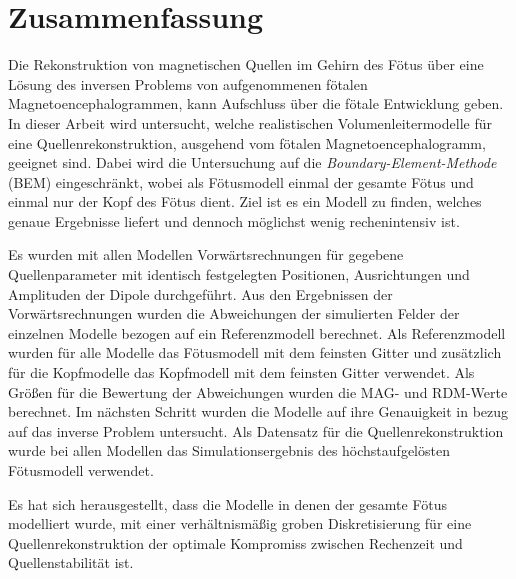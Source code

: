 
\chapter{Zusammenfassung}
Die Rekonstruktion von magnetischen Quellen im Gehirn des Fötus über
eine Lösung des inversen Problems von aufgenommenen fötalen
Magnetoencephalogrammen, kann Aufschluss über die fötale Entwicklung
geben. In dieser Arbeit wird untersucht, welche realistischen
Volumenleitermodelle für eine Quellenrekonstruktion, ausgehend vom
fötalen Magnetoencephalogramm, geeignet sind. Dabei wird die
Untersuchung auf die \textit{Boundary-Element-Methode} (BEM)
eingeschränkt, wobei als Fötusmodell einmal der gesamte Fötus und
einmal nur der Kopf des Fötus dient. Ziel ist es ein Modell zu finden,
welches genaue Ergebnisse liefert und dennoch möglichst wenig
rechenintensiv ist.

Es wurden mit allen Modellen Vorwärtsrechnungen für gegebene
Quellenparameter mit identisch festgelegten Positionen, Ausrichtungen
und Amplituden der Dipole durchgeführt. Aus den Ergebnissen der
Vorwärtsrechnungen wurden die Abweichungen der simulierten Felder der
einzelnen Modelle bezogen auf ein Referenzmodell berechnet. Als
Referenzmodell wurden für alle Modelle das Fötusmodell mit dem feinsten
Gitter und zusätzlich für die Kopfmodelle das Kopfmodell mit dem
feinsten Gitter verwendet. Als Größen für die Bewertung der
Abweichungen wurden die MAG- und RDM-Werte berechnet. Im nächsten
Schritt wurden die Modelle auf ihre Genauigkeit in bezug auf das
inverse Problem untersucht. Als Datensatz für die Quellenrekonstruktion
wurde bei allen Modellen das Simulationsergebnis des höchstaufgelösten
Fötusmodell verwendet.

Es hat sich herausgestellt, dass die Modelle in denen der gesamte Fötus
modelliert wurde, mit einer verhältnismäßig groben Diskretisierung für
eine Quellenrekonstruktion der optimale Kompromiss zwischen Rechenzeit
und Quellenstabilität ist.
